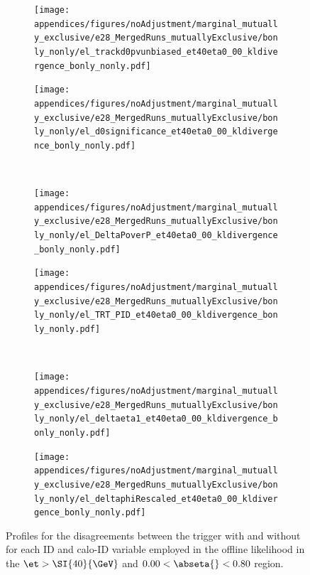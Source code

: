 \begin{figure}[htb]
\begin{center}
\begin{subfigure}[c]{.48\textwidth}
\centering
\texttt{[image: appendices/figures/noAdjustment/marginal\_mutually\_exclusive/e28\_MergedRuns\_mutuallyExclusive/bonly\_nonly/el\_trackd0pvunbiased\_et40eta0\_00\_kldivergence\_bonly\_nonly.pdf]}
\caption{}%
\label{fig:pseudo_d0}
\end{subfigure}
\hfill
\begin{subfigure}[c]{.48\textwidth}
\centering
\texttt{[image: appendices/figures/noAdjustment/marginal\_mutually\_exclusive/e28\_MergedRuns\_mutuallyExclusive/bonly\_nonly/el\_d0significance\_et40eta0\_00\_kldivergence\_bonly\_nonly.pdf]}
\caption{}%
\label{fig:pseudo_d0significance}
\end{subfigure} \\
\begin{subfigure}[c]{.48\textwidth}
\centering
\texttt{[image: appendices/figures/noAdjustment/marginal\_mutually\_exclusive/e28\_MergedRuns\_mutuallyExclusive/bonly\_nonly/el\_DeltaPoverP\_et40eta0\_00\_kldivergence\_bonly\_nonly.pdf]}
\caption{}%
\label{fig:pseudo_poverp}
\end{subfigure}
\hfill
\begin{subfigure}[c]{.48\textwidth}
\centering
\texttt{[image: appendices/figures/noAdjustment/marginal\_mutually\_exclusive/e28\_MergedRuns\_mutuallyExclusive/bonly\_nonly/el\_TRT\_PID\_et40eta0\_00\_kldivergence\_bonly\_nonly.pdf]}
\caption{}%
\label{fig:pseudo_TRT_PID}
\end{subfigure} \\
\end{center}
\end{figure}%
\begin{figure}[t]\ContinuedFloat
\begin{center}
\begin{subfigure}[c]{.48\textwidth}
\centering
\texttt{[image: appendices/figures/noAdjustment/marginal\_mutually\_exclusive/e28\_MergedRuns\_mutuallyExclusive/bonly\_nonly/el\_deltaeta1\_et40eta0\_00\_kldivergence\_bonly\_nonly.pdf]}
\caption{}%
\label{fig:pseudo_deta}
\end{subfigure}
\hfill
\begin{subfigure}[c]{.48\textwidth}
\centering
\texttt{[image: appendices/figures/noAdjustment/marginal\_mutually\_exclusive/e28\_MergedRuns\_mutuallyExclusive/bonly\_nonly/el\_deltaphiRescaled\_et40eta0\_00\_kldivergence\_bonly\_nonly.pdf]}
\caption{}%
\label{fig:pseudo_dphi}
\end{subfigure}
\caption{Profiles for the disagreements between
  the trigger with and without \rnn{} for each ID and calo-ID variable employed
in the offline likelihood in the $\et>\SI{40}{\GeV}$ and $0.00<\abseta{}<0.80$
region.}%
\label{fig:pseudo_track}
\end{center}
\end{figure}
